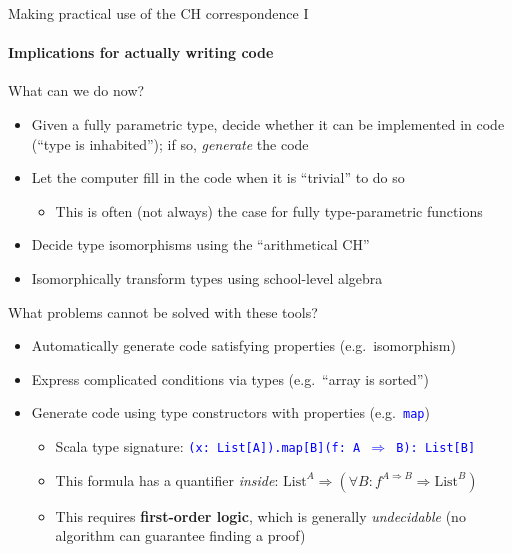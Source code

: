 \documentclass[english]{beamer}
\begin{document}
\begin{frame}{Making practical use of the CH correspondence I}


\framesubtitle{Implications for actually writing code}

What can we do now?
\begin{itemize}
\item Given a fully parametric type, decide whether it can be implemented
in code (``type is inhabited''); if so, \emph{generate} the code
\item Let the computer fill in the code when it is ``trivial'' to do so
\begin{itemize}
\item This is often (not always) the case for fully type-parametric functions
\end{itemize}
\item Decide type isomorphisms using the ``arithmetical CH''
\item Isomorphically transform types using school-level algebra
\end{itemize}
What problems cannot be solved with these tools?
\begin{itemize}
\item Automatically generate code satisfying properties (e.g.\ isomorphism) 
\item Express complicated conditions via types (e.g.\ ``array is sorted'') 
\item Generate code using type constructors with properties (e.g.\ \texttt{\textcolor{blue}{\footnotesize{}map}})
\begin{itemize}
\item Scala type signature: \texttt{\textcolor{blue}{\footnotesize{}(x:\ List{[}A{]}).map{[}B{]}(f:\ A
$\Rightarrow$ B):\ List{[}B{]}}}{\footnotesize \par}
\item This formula has a quantifier \emph{inside}: $\text{List}^{A}\Rightarrow(\forall B:f^{A\Rightarrow B}\Rightarrow\text{List}^{B})$
\item This requires \textbf{first-order logic}, which is generally \emph{undecidable}
(no algorithm can guarantee finding a proof)
\end{itemize}
\end{itemize}
\end{frame}
\end{document}
